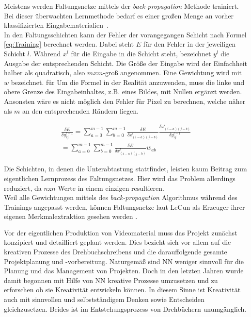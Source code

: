 \documentclass[times, 11pt,twocolumn]{article}
\begin{document}
 \label{sec:Training}
Meistens werden Faltungsnetze mittels der \textit{back-propagation} Methode trainiert. Bei dieser überwachten Lernmethode bedarf es einer großen Menge an vorher klassifizierten Eingabematerialien~\cite{5537907}. \\
In den Faltungsschichten kann der Fehler der vorangegangen Schicht nach Formel \ref{eq:Training} berechnet werden. Dabei steht $E$ für den Fehler in der jeweiligen Schicht $l$. Während $x^l$ für die Eingabe in die Schicht steht, bezeichnet $y^l$ die Ausgabe der entsprechenden Schicht. Die Größe der Eingabe wird der Einfachheit halber als quadratisch, also $mxm$-groß angenommen. Eine Gewichtung wird mit $w$ bezeichnet. für Um die Formel in der Realität anzuwenden, muss die linke und obere Grenze des Eingabeinhaltes, z.B. eines Bildes, mit Nullen ergänzt werden. Ansonsten wäre es nicht möglich den Fehler für Pixel zu berechnen, welche näher als $m$ an den entsprechenden Rändern liegen. 

\footnotesize
\begin{equation}
\begin{aligned}
\frac{\delta E}{\delta y_{ij}^{l-1}} = \sum_{a=0}^{m-1} \sum_{b=0}^{m-1} \frac{\delta E}{\delta x_{(i-a)(j-b)}^{l}} \frac{\delta x_{(i-a)(j-b)}^{l}}{\delta y_{ij}^{l-1}}  \\
= \sum \limits_{a=0}^{m-1} \sum \limits_{b=0}^{m-1} \frac{\delta E}{\delta x_{(i-a)(j-b)}^{l}} w_{ab}
\end{aligned}
	\label{eq:Training}
\end{equation}
\small

Die Schichten, in denen die Unterabtastung stattfindet, leisten kaum Beitrag zum eigentlichen Lernprozess des Faltungsnetzes. Hier wird das Problem allerdings reduziert, da $n$x$n$ Werte in einem einzigen resultieren. \\
Weil alle Gewichtungen mittels des \textit{back-propagation} Algorithmus während des Trainings angepasst werden, können Faltungsnetze laut LeCun als Erzeuger ihrer eigenen Merkmalextraktion gesehen werden \cite{LeCun:1998:CNI:303568.303704}.








 \label{sec:Konzeption}
Vor der eigentlichen Produktion von Videomaterial muss das Projekt zunächst konzipiert und detailliert geplant werden. Dies bezieht sich vor allem auf die kreativen Prozesse des Drehbuchschreibens und die darauffolgende gesamte Projektplanung und -vorbereitung. Naturgemäß sind NN weniger sinnvoll für die Planung und das Management von Projekten. Doch in den letzten Jahren wurde damit begonnen mit Hilfe von NN kreative Prozesse umzusetzen und zu erforschen ob sie Kreativität entwickeln können. In diesem Sinne ist Kreativität auch mit sinnvollen und selbstständigem Denken sowie Entscheiden gleichzusetzen. Beides ist im Entstehungsprozess von Drehbüchern unumgänglich.
\end{document}
